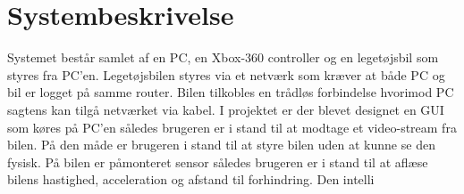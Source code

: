 \chapter{Systembeskrivelse} \label{ch:Systembeskrivelse}
Systemet består samlet af en PC, en Xbox-360 controller og en legetøjsbil som styres fra PC'en. Legetøjsbilen styres via et netværk som kræver at både PC og bil er logget på samme router. Bilen tilkobles en trådløs forbindelse hvorimod PC sagtens kan tilgå netværket via kabel. I projektet er der blevet designet en GUI som køres på PC'en således brugeren er i stand til at modtage et video-stream fra bilen. På den måde er brugeren i stand til at styre bilen uden at kunne se den fysisk. På bilen er påmonteret sensor således brugeren er i stand til at aflæse bilens hastighed, acceleration og afstand til forhindring. Den intelli
